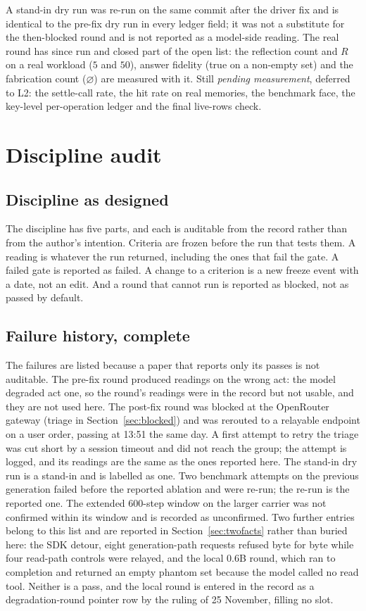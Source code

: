 \documentclass[11pt,a4paper]{article}
\begin{document}
A stand-in dry run was re-run on the same commit after the driver fix and is identical to the pre-fix dry run in every ledger field; it was not a substitute for the then-blocked round and is not reported as a model-side reading. The real round has since run and closed part of the open list: the reflection count and $R$ on a real workload ($5$ and $50$), answer fidelity (true on a non-empty set) and the fabrication count ($\varnothing$) are measured with it. Still \emph{pending measurement}, deferred to L2: the settle-call rate, the hit rate on real memories, the benchmark face, the key-level per-operation ledger and the final live-rows check.

\section{Discipline audit}
\label{sec:discipline}

\subsection{Discipline as designed}
The discipline has five parts, and each is auditable from the record rather than from the author's intention. Criteria are frozen before the run that tests them. A reading is whatever the run returned, including the ones that fail the gate. A failed gate is reported as failed. A change to a criterion is a new freeze event with a date, not an edit. And a round that cannot run is reported as blocked, not as passed by default.

\subsection{Failure history, complete}
The failures are listed because a paper that reports only its passes is not auditable. The pre-fix round produced readings on the wrong act: the model degraded act one, so the round's readings were in the record but not usable, and they are not used here. The post-fix round was blocked at the OpenRouter gateway (triage in Section~\ref{sec:blocked}) and was rerouted to a relayable endpoint on a user order, passing at 13:51 the same day. A first attempt to retry the triage was cut short by a session timeout and did not reach the group; the attempt is logged, and its readings are the same as the ones reported here. The stand-in dry run is a stand-in and is labelled as one. Two benchmark attempts on the previous generation failed before the reported ablation and were re-run; the re-run is the reported one. The extended 600-step window on the larger carrier was not confirmed within its window and is recorded as unconfirmed. Two further entries belong to this list and are reported in Section~\ref{sec:twofacts} rather than buried here: the SDK detour, eight generation-path requests refused byte for byte while four read-path controls were relayed, and the local 0.6B round, which ran to completion and returned an empty phantom set because the model called no read tool. Neither is a pass, and the local round is entered in the record as a degradation-round pointer row by the ruling of 25 November, filling no slot.
\end{document}
